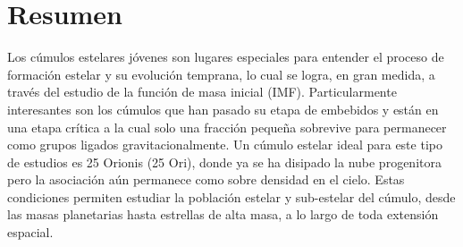 \documentclass[12pt]{article}
\providecommand\phantomsection{} %
\begin{document}
\newpage
\tableofcontents
\newpage
\newpage
\phantomsection
{}
\listoffigures
\newpage
\phantomsection
{}
\listoftables
\newpage
\phantomsection
{}
\printacronyms[include-classes=abbrev,name=Abbreviations]
\newpage
\phantomsection
{}
\printacronyms[include-classes=nomencl,name=Nomenclature]
\newpage

\phantomsection
\section*{\centering Resumen}
%

Los c\'umulos estelares j\'ovenes son lugares especiales para entender el proceso de formaci\'on estelar y su evoluci\'on temprana, lo cual se logra, en gran medida, a trav\'es del estudio de la funci\'on de masa inicial (IMF). Particularmente interesantes son los c\'umulos que han pasado su etapa de embebidos y est\'an en una etapa cr\'itica a la cual solo una fracci\'on peque\~na sobrevive para permanecer como grupos ligados gravitacionalmente. Un c\'umulo estelar ideal para este tipo de estudios es 25 Orionis (25 Ori), donde ya se ha disipado la nube progenitora pero la asociaci\'on a\'un permanece como sobre densidad en el cielo. Estas condiciones permiten estudiar la poblaci\'on estelar y sub-estelar del c\'umulo, desde las masas planetarias hasta estrellas de alta masa, a lo largo de toda extensi\'on espacial. 
\end{document}
